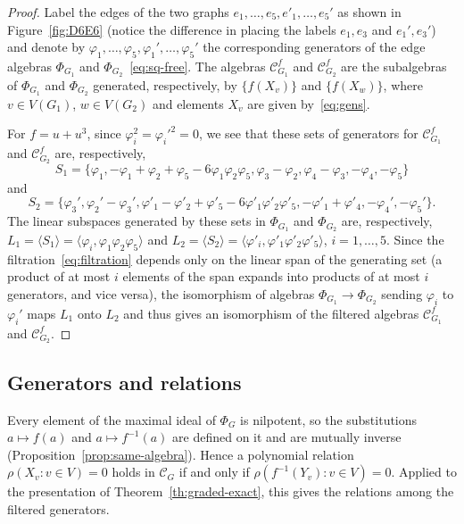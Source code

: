 \documentclass[reqno]{article}
\theoremstyle{plain} %
\theoremstyle{definition}
\theoremstyle{remark}
\newcommand {\CC}{\mathscr{C}}
\numberwithin{equation}{section}
\begin{document}
\begin{proof}
  Label the edges of the two graphs $e_1,\ldots,e_5,e'_1,\ldots,e_5'$ as shown in Figure~\ref{fig:D6E6} (notice the difference in placing the labels $e_1,e_3$ and $e_1',e_3'$) and denote by  $\varphi_1,\ldots,\varphi_5,\varphi_1',\ldots,\varphi_5'$ the corresponding generators of the edge algebras $\Phi_{G_1}$ and $\Phi_{G_2}$~\eqref{eq:sq-free}.
  The algebras $\CC^f_{G_1}$ and $\CC^f_{G_2}$ are the subalgebras of $\Phi_{G_1}$ and $\Phi_{G_2}$ generated, respectively,
  by $\{f(X_v)\}$  and $\{f(X_w)\}$, where $v\in  V(G_1)$, $w\in  V(G_2)$ and elements $X_v$ are given by~\eqref{eq:gens}.

  For $f=u+u^3$, since $\varphi_i^2=\varphi_i'^2=0$, we see that these sets of generators for $\CC_{G_1}^f$ and $\CC_{G_2}^f$ are, respectively, \[S_1=\{\varphi_1, -\varphi_1+\varphi_2+\varphi_5-6\varphi_1\varphi_2\varphi_5, \varphi_3-\varphi_2,\varphi_4-\varphi_3,-\varphi_4,-\varphi_5\}\]
and
\[S_2=\{\varphi_3', \varphi_2'-\varphi_3', \varphi'_1-\varphi'_2+\varphi'_5-6\varphi'_1\varphi'_2\varphi'_5, -\varphi'_1+\varphi'_4,-\varphi_4',-\varphi_5'\}.\]
The linear subspaces generated by these sets in $\Phi_{G_1}$ and $\Phi_{G_2}$
are, respectively,
$L_1=\langle S_1 \rangle=\langle \varphi_i,\varphi_1\varphi_2\varphi_5 \rangle$ and
$L_2=\langle S_2 \rangle=\langle \varphi'_i,\varphi'_1\varphi'_2\varphi'_5 \rangle$, $i=1,\ldots,5$.
Since the filtration~\eqref{eq:filtration} depends only on the linear span of the generating set (a product of at most $i$ elements of the span expands into products of at most $i$ generators, and vice versa), the isomorphism of algebras $\Phi_{G_1}\to \Phi_{G_2}$ sending $\varphi_i$ to $\varphi_i'$ maps $L_1$ onto $L_2$ and thus gives an isomorphism of the filtered algebras $\CC_{G_1}^f$ and $\CC_{G_2}^f$.

\end{proof}

\subsection{Generators and relations}
\label{sec:gen-rels}

Every element of the maximal ideal of $\Phi_G$ is nilpotent, so the
substitutions $a\mapsto f(a)$ and $a\mapsto f^{-1}(a)$ are defined on it
and are mutually inverse (Proposition~\ref{prop:same-algebra}). Hence
a polynomial relation $\rho(X_v:v\in V)=0$ holds in $\CC_G$ if and only
if $\rho(f^{-1}(Y_v):v\in V)=0$. Applied to the presentation of
Theorem~\ref{th:graded-exact}, this gives the relations among the
filtered generators.
\end{document}
